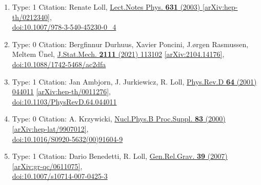 \documentclass[a4paper,10pt]{article}
\begin{document}
\begin{enumerate}
\begin{enumerate}
  \item Type: 1 Citation: Renate Loll, \href{https://www.doi.org/10.1007/978-3-540-45230-0_4}{Lect.Notes Phys. {\bf 631} (2003) }  \href{https://arxiv.org/abs/hep-th/0212340}{[arXiv:hep-th/0212340]},\\\href{https://www.doi.org/10.1007/978-3-540-45230-0_4}{doi:10.1007/978-3-540-45230-0\_4}
  \item Type: 0 Citation: Bergfinnur Durhuus, Xavier Poncini, J.ørgen Rasmussen, Meltem Ünel, \href{https://www.doi.org/10.1088/1742-5468/ac2dfa}{J.Stat.Mech. {\bf 2111} (2021) 113102}  \href{https://arxiv.org/abs/2104.14176}{[arXiv:2104.14176]},\\\href{https://www.doi.org/10.1088/1742-5468/ac2dfa}{doi:10.1088/1742-5468/ac2dfa}
  \item Type: 1 Citation: Jan Ambjorn, J. Jurkiewicz, R. Loll, \href{https://www.doi.org/10.1103/PhysRevD.64.044011}{Phys.Rev.D {\bf 64} (2001) 044011}  \href{https://arxiv.org/abs/hep-th/0011276}{[arXiv:hep-th/0011276]},\\\href{https://www.doi.org/10.1103/PhysRevD.64.044011}{doi:10.1103/PhysRevD.64.044011}
  \item Type: 0 Citation: A. Krzywicki, \href{https://www.doi.org/10.1016/S0920-5632(00)91604-9}{Nucl.Phys.B Proc.Suppl. {\bf 83} (2000) }  \href{https://arxiv.org/abs/hep-lat/9907012}{[arXiv:hep-lat/9907012]},\\\href{https://www.doi.org/10.1016/S0920-5632(00)91604-9}{doi:10.1016/S0920-5632(00)91604-9}
  \item Type: 1 Citation: Dario Benedetti, R. Loll, \href{https://www.doi.org/10.1007/s10714-007-0425-3}{Gen.Rel.Grav. {\bf 39} (2007) }  \href{https://arxiv.org/abs/gr-qc/0611075}{[arXiv:gr-qc/0611075]},\\\href{https://www.doi.org/10.1007/s10714-007-0425-3}{doi:10.1007/s10714-007-0425-3}

\end{enumerate}
\end{enumerate}
\end{document}
